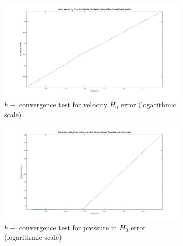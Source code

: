 \documentclass[a4paper]{book}
\begin{document}
\begin{figure}
\begin{subfigure}{\textwidth}	
  \includegraphics[width=\linewidth]{H0_convergence_velocity_n_s_log.jpg}
  \caption{$h-$ convergence test for velocity $H_0$ error (logarithmic scale)}
  \label{fig:vel_navier_stoke_conv_log_h0}
\end{subfigure}
\begin{subfigure}{\textwidth}	
  \includegraphics[width=\linewidth]{H0_convergence_pressure_n_s_log.jpg}
  \caption{$h-$ convergence test for pressure in $H_0$ error (logarithmic scale)}
  \label{fig:pre_navier_stoke_conv_log_h0}
\end{subfigure}
\caption{\label{navier_stoke_conv_h0_log}}
\end{figure}
\end{document}

